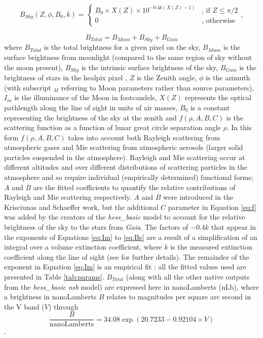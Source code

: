 \begin{equation}
    \begin{split}
    B_{Sky}(Z,\phi,B_0,k)=\begin{cases} B_0\times X(Z) \times 10^{-0.4k(X(Z)-1)} & \mbox{, if }  Z\leq\pi/2 \\ 0 & \mbox{, otherwise } \end{cases},
    \end{split}
    \label{eq:Bs}
\end{equation}

\begin{equation}
    B_{Total}=B_{Moon}+B_{Sky}+B_{Gaia}
    \label{eq:Bt}
\end{equation}
where $B_{Total}$ is the total brightness for a given pixel on the sky, $B_{Moon}$ is the surface brightness from moonlight (compared to the same region of sky without the moon present), $B_{Sky}$ is the intrinsic surface brightness of the sky, $B_{Gaia}$ is the brightness of stars in the healpix pixel \cite{healpix}, $Z$ is the Zenith angle, $\phi$ is the azimuth (with subscript $_M$ referring to Moon parameters rather than source parameters), $I_m$ is the illuminance of the Moon in footcandels, $X(Z)$ represents the optical pathlength along the line of sight in units of air masses, $B_0$ is a constant representing the brightness of the sky at the zenith and $f(\rho,A,B,C)$ is the scattering function as a function of lunar great circle separation angle $\rho$. In this form $f(\rho,A,B,C)$ takes into account both Rayleigh scattering from atmospheric gases and Mie scattering from atmospheric aerosols (larger solid particles suspended in the atmosphere). Rayleigh and Mie scattering occur at different altitudes and over different distributions of scattering particles in the atmosphere and so require individual (empirically determined) functional forms; $A$ and $B$ are the fitted coefficients to quantify the relative contributions of Rayleigh and Mie scattering respectively. $A$ and $B$ were introduced in the Krisciunas and Schaeffer \cite{Krisciunas} work, but the additional $C$ parameter in Equation \ref{eq:f} was added by the creators of the \textit{hess\_basic} model to account for the relative brightness of the sky to the stars from \textit{Gaia}. The factors of $-0.4k$ that appear in the exponents of Equations \ref{eq:Im} to \ref{eq:Bs} are a result of a simplification of an integral over a volume extinction coefficient, where $k$ is the measured extinction coefficient along the line of sight (see \cite{Krisciunas} for further details). The remainder of the exponent in Equation \ref{eq:Im} is an empirical fit \cite{Krisciunas}; all the fitted values used are presented in Table \ref{tab:params}. $B_{Total}$ (along with all the other native outputs from the \textit{hess\_basic} \textit{nsb} model) are expressed here in nanoLamberts (nLb), where a brightness in nanoLamberts $B$ relates to magnitudes per square arc second in the V band ($V$) through
\begin{equation}
    \frac{B}{\textrm{nanoLamberts}}=34.08\exp(20.7233-0.92104\times V)
\end{equation}
\cite{Krisciunas}.

